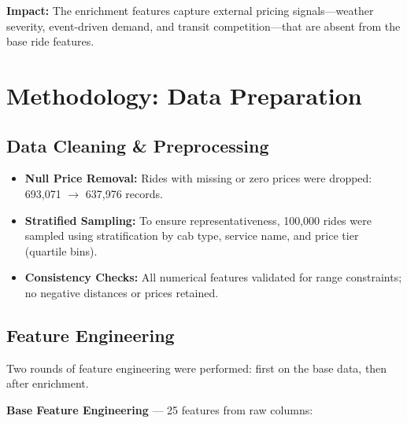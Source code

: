 \documentclass[12pt,a4paper]{article}
\begin{document}
\textbf{Impact:} The enrichment features capture external pricing signals---weather severity, event-driven demand, and transit competition---that are absent from the base ride features.

\newpage

\section{Methodology: Data Preparation}

\subsection{Data Cleaning \& Preprocessing}

\begin{itemize}
    \item \textbf{Null Price Removal:} Rides with missing or zero prices were dropped: 693,071 $\rightarrow$ 637,976 records.
    \item \textbf{Stratified Sampling:} To ensure representativeness, 100,000 rides were sampled using stratification by cab type, service name, and price tier (quartile bins).
    \item \textbf{Consistency Checks:} All numerical features validated for range constraints; no negative distances or prices retained.
\end{itemize}

\subsection{Feature Engineering}

Two rounds of feature engineering were performed: first on the base data, then after enrichment.

\textbf{Base Feature Engineering} --- 25 features from raw columns:
\end{document}

